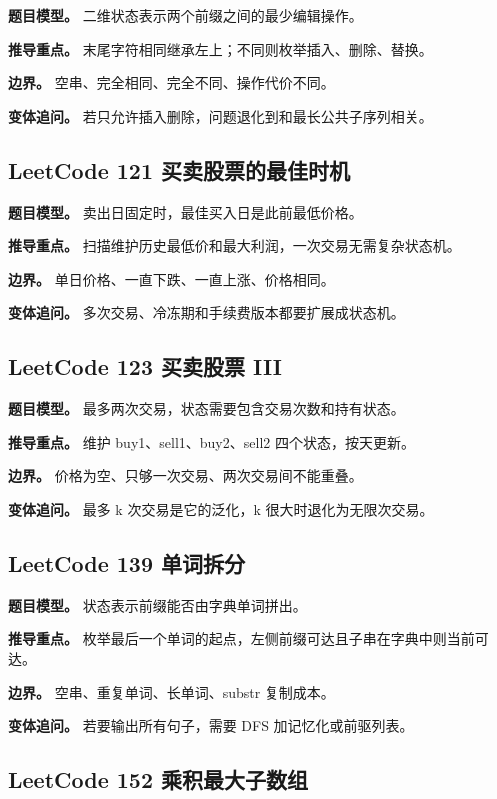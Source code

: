 \textbf{题目模型。} 二维状态表示两个前缀之间的最少编辑操作。

\textbf{推导重点。} 末尾字符相同继承左上；不同则枚举插入、删除、替换。

\textbf{边界。} 空串、完全相同、完全不同、操作代价不同。

\textbf{变体追问。} 若只允许插入删除，问题退化到和最长公共子序列相关。

\subsection{LeetCode 121 买卖股票的最佳时机}

\textbf{题目模型。} 卖出日固定时，最佳买入日是此前最低价格。

\textbf{推导重点。} 扫描维护历史最低价和最大利润，一次交易无需复杂状态机。

\textbf{边界。} 单日价格、一直下跌、一直上涨、价格相同。

\textbf{变体追问。} 多次交易、冷冻期和手续费版本都要扩展成状态机。

\subsection{LeetCode 123 买卖股票 III}

\textbf{题目模型。} 最多两次交易，状态需要包含交易次数和持有状态。

\textbf{推导重点。} 维护 buy1、sell1、buy2、sell2 四个状态，按天更新。

\textbf{边界。} 价格为空、只够一次交易、两次交易间不能重叠。

\textbf{变体追问。} 最多 k 次交易是它的泛化，k 很大时退化为无限次交易。

\subsection{LeetCode 139 单词拆分}

\textbf{题目模型。} 状态表示前缀能否由字典单词拼出。

\textbf{推导重点。} 枚举最后一个单词的起点，左侧前缀可达且子串在字典中则当前可达。

\textbf{边界。} 空串、重复单词、长单词、substr 复制成本。

\textbf{变体追问。} 若要输出所有句子，需要 DFS 加记忆化或前驱列表。

\subsection{LeetCode 152 乘积最大子数组}

